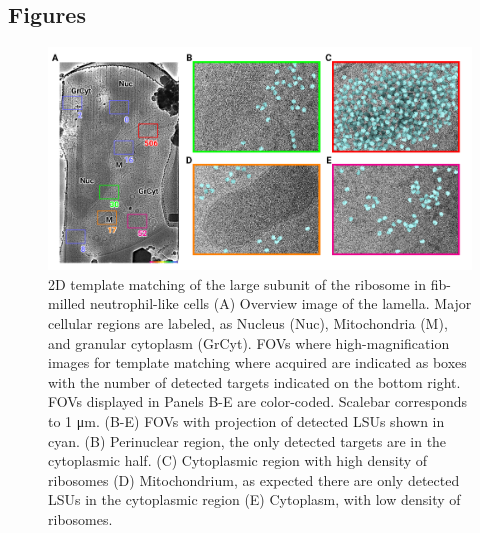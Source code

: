 \documentclass[
]{article}
\begin{document}
\hypertarget{figures}{%
\subsection{Figures}\label{figures}}

\begin{figure}
\hypertarget{fig:initmatching}{%
\centering
\includegraphics{figures/initmatching.png}
\caption{2D template matching of the large subunit of the ribosome in fib-milled neutrophil-like cells
(A) Overview image of the lamella. Major cellular regions are labeled, as Nucleus (Nuc), Mitochondria (M), and granular cytoplasm (GrCyt). FOVs where high-magnification images for template matching where acquired are indicated as boxes with the number of detected targets indicated on the bottom right. FOVs displayed in Panels B-E are color-coded. Scalebar corresponds to 1 μm.
(B-E) FOVs with projection of detected LSUs shown in cyan. (B) Perinuclear region, the only detected targets are in the cytoplasmic half. (C) Cytoplasmic region with high density of ribosomes (D) Mitochondrium, as expected there are only detected LSUs in the cytoplasmic region (E) Cytoplasm, with low density of ribosomes.}\label{fig:initmatching}
}
\end{figure}
\end{document}
